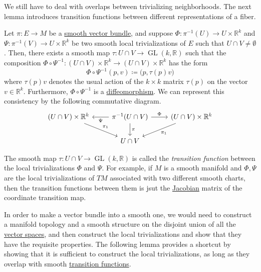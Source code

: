 \documentclass{article}
\DeclareMathOperator{\GL}{GL}
\newcounter{definition}[section]
\newcounter{example}[section]
\begin{document}
  We still have to deal with overlaps between trivializing neighborhoods. The next lemma introduces transition functions between different representations of a fiber. 

  \begin{lemma}
    \label{thm:overlaps-between-trivializing-neighborhoods}
  Let $\pi: E \to M$ be a \hyperref[def:smooth-vector-bundle]{smooth vector bundle}, and suppose $\Phi: \pi^{-1} (U) \to U \times \mathbb{R}^k$ and $\Psi: \pi^{-1} (V) \to U \times \mathbb{R}^k$ be two smooth local trivializations of $E$ such that $U \cap V \neq \emptyset$. Then, there exists a smooth map $\tau: U \cap V \to \GL(k, \mathbb{R})$ such that the composition $\Phi \circ \Psi^{-1} : (U \cap V) \times \mathbb{R}^k \to (U \cap V) \times \mathbb{R}^k$ has the form
  \begin{equation}
    \Phi \circ \Psi^{-1} (p, v) \coloneqq \big(p, \tau(p) v \big)
  \end{equation}
  where $\tau(p) v$ denotes the usual action of the $k \times k$ matrix $\tau(p)$ on the vector $v \in \mathbb{R}^k$. Furthermore, $\Phi \circ \Psi^{-1}$ is a \hyperref[def:diffeomorphism-2]{diffeomorphism}. We can represent this consistency by the following commutative diagram. 
  \begin{equation}
    \begin{tikzcd}
      (U \cap V) \times \mathbb{R}^k \arrow{dr}{\pi_1}& \pi^{-1} (U \cap V) \arrow{l}{\Psi} \arrow{r}{\Phi} \arrow{d}{\pi} & (U \cap V) \times \mathbb{R}^k \arrow{dl}{\pi_1}\\
      & U \cap V &
      \end{tikzcd}
  \end{equation}
  \end{lemma}

  \begin{definition}
    \label{def:transition-function}
  The smooth map $\tau: U \cap V \to \GL(k, \mathbb{R})$ is called the \textit{transition function} between the local trivializations $\Phi$ and $\Psi$. For example, if $M$ is a smooth manifold and $\Phi, \Psi$ are the local trivializations of $TM$ associated with two different smooth charts, then the transition functions between them is jsut the \hyperref[mv-def:jacobian]{Jacobian} matrix of the coordinate transition map. 
  \end{definition}

  In order to make a vector bundle into a smooth one, we would need to construct a manifold topology and a smooth structure on the disjoint union of all the \hyperref[lin-def:vector-space]{vector spaces}, and then construct the local trivializations and show that they have the requisite properties. The following lemma provides a shortcut by showing that it is sufficient to construct the local trivializations, as long as they overlap with smooth \hyperref[def:transition-function]{transition functions}. 
\end{document}
